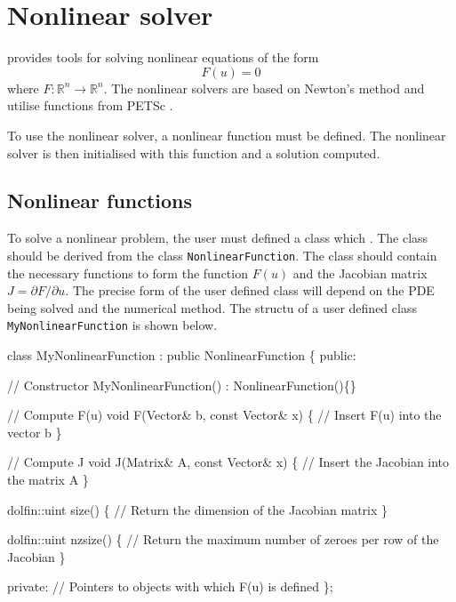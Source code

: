\chapter{Nonlinear solver}


\dolfin{} provides tools for solving nonlinear equations of the form
\begin{equation}
  F(u) = 0
\end{equation}
where $F: \mathbb{R}^{n} \rightarrow \mathbb{R}^{n}$. The nonlinear solvers are
based on Newton's method and utilise functions from PETSc \cite{www:petsc}.    

To use the nonlinear solver, a nonlinear function must be defined. The nonlinear
solver is then initialised with this function and a solution computed.



\section{Nonlinear functions}

To solve a nonlinear problem, the user must defined a class which . The class 
should be derived from the \dolfin class \texttt{NonlinearFunction}. The class 
should contain the necessary functions to form the function $F(u)$ and the 
Jacobian matrix  $J = \partial F / \partial u$. The precise form of the user 
defined class will depend on the PDE being solved and the numerical method.
The structu of a user defined class \texttt{MyNonlinearFunction} is shown below.
\begin{code}
class MyNonlinearFunction : public NonlinearFunction
\{
  public: 
  
    // Constructor 
    MyNonlinearFunction() : NonlinearFunction()\{\}
  
    // Compute F(u) 
    void F(Vector\& b, const Vector\& x)
    \{
      // Insert F(u) into the vector b 
    \}

    // Compute J
    void J(Matrix\& A, const Vector\& x)
    \{
      // Insert the Jacobian into the matrix A 
    \}

    dolfin::uint size()
    \{      
      // Return the dimension of the Jacobian matrix 
    \}

    dolfin::uint nzsize()
    \{      
      // Return the maximum number of zeroes per row of the Jacobian
    \}

  private:
    // Pointers to objects with which F(u) is defined
\};
\end{code}


